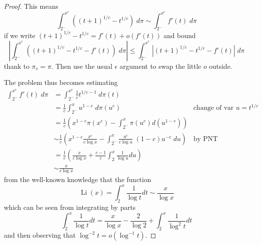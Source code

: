 \documentclass[12pt]{article}
\newcommand{\Abs}[1]{\left| #1 \right|}
\begin{document}
\begin{proof}
This means
$$\int_{2^-}^{x^c} ((t + 1)^{1/c} - t^{1/c}) \; d \pi \sim \int_{2^-}^{x^c} f'(t) \; d \pi$$
if we write $(t + 1)^{1/c} - t^{1/c} = f'(t) + o(f'(t))$ and bound
$$\Abs{ \int_{2^-}^{x^c} ((t + 1)^{1/c} - t^{1/c} - f'(t)) \; d \pi } \leq \int_{2^-}^{x^c} \Abs{ (t + 1)^{1/c} - t^{1/c} - f'(t) } \; d \pi$$
thank to $\pi_v = \pi$. Then use the usual $\epsilon$ argument to swap the little $o$ outside.

The problem thus becomes estimating
\begin{align*}
\int_{2^-}^{x^c} f'(t) \; d \pi &= \int_{2^-}^{x^c} \frac{1}{c} t^{1/c - 1} \; d \pi(t)\\
&= \frac{1}{c} \int_{2^-}^{x} u^{1-c} \; d \pi(u^c) &\text{change of var } u = t^{1/c}\\
&= \frac{1}{c} \left( x^{1-c} \pi(x^c) - \int_{2^-}^{x} \pi(u^c)  d(u^{1-c}) \right)\\
&\sim \frac{1}{c} \left( x^{1-c} \frac{x^c}{c \log x} - \int_{2^-}^{x} \frac{u^c}{c \log u} \; (1-c) u^{-c} \; du \right) &\text{by PNT}\\
&= \frac{1}{c} \left( \frac{x}{c \log x} + \frac{c-1}{c} \int_{2}^{x} \frac{1}{\log u} du \right)\\
&\sim \frac{x}{c \log x}
\end{align*}
from the well-known knowledge that the function
$$\operatorname{Li}(x) = \int_2^x \frac{1}{\log t} dt \sim \frac{x}{\log x}$$
which can be seen from integrating by parts
$$\int_2^x \frac{1}{\log t} dt = \frac{x}{\log x} - \frac{2}{\log 2} + \int_2^x \frac{1}{\log^2 t} dt$$
and then observing that $\log^{-2} t = o(\log^{-1} t)$.
\end{proof}

\unless\ifdefined\IsMainDocument
\end{document}
